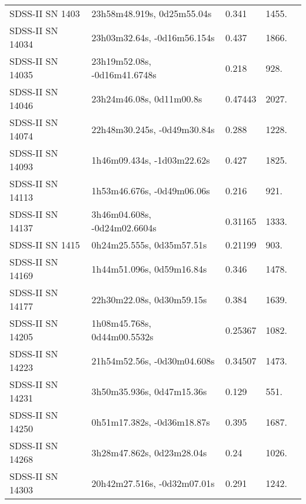 \begin{longtable}{lllll}
  SDSS-II SN 1403 &     23h58m48.919s, 0d25m55.04s &    0.341 &          1455. &    \citet{2010ApJ...713.1026D} \\
 SDSS-II SN 14034 &    23h03m32.64s, -0d16m56.154s &    0.437 &          1866. &    \citet{2011ApJ...738..162S} \\
 SDSS-II SN 14035 &   23h19m52.08s, -0d16m41.6748s &    0.218 &           928. &    \citet{2011ApJ...738..162S} \\
 SDSS-II SN 14046 &       23h24m46.08s, 0d11m00.8s &  0.47443 &          2027. &    \citet{2016SDSSD.C...0000:} \\
 SDSS-II SN 14074 &    22h48m30.245s, -0d49m30.84s &    0.288 &          1228. &    \citet{2011ApJ...738..162S} \\
 SDSS-II SN 14093 &     1h46m09.434s, -1d03m22.62s &    0.427 &          1825. &    \citet{2010ApJ...713.1026D} \\
 SDSS-II SN 14113 &     1h53m46.676s, -0d49m06.06s &    0.216 &           921. &    \citet{2011ApJ...738..162S} \\
 SDSS-II SN 14137 &   3h46m04.608s, -0d24m02.6604s &  0.31165 &          1333. &    \citet{2016SDSSD.C...0000:} \\
  SDSS-II SN 1415 &      0h24m25.555s, 0d35m57.51s &  0.21199 &           903. &    \citet{2003SDSS1.C...0000:} \\
 SDSS-II SN 14169 &      1h44m51.096s, 0d59m16.84s &    0.346 &          1478. &    \citet{2011ApJ...738..162S} \\
 SDSS-II SN 14177 &      22h30m22.08s, 0d30m59.15s &    0.384 &          1639. &    \citet{2011ApJ...738..162S} \\
 SDSS-II SN 14205 &    1h08m45.768s, 0d44m00.5532s &  0.25367 &          1082. &    \citet{2016SDSSD.C...0000:} \\
 SDSS-II SN 14223 &    21h54m52.56s, -0d30m04.608s &  0.34507 &          1473. &    \citet{2016SDSSD.C...0000:} \\
 SDSS-II SN 14231 &      3h50m35.936s, 0d47m15.36s &    0.129 &           551. &    \citet{2011ApJ...738..162S} \\
 SDSS-II SN 14250 &     0h51m17.382s, -0d36m18.87s &    0.395 &          1687. &    \citet{2011ApJ...738..162S} \\
 SDSS-II SN 14268 &      3h28m47.862s, 0d23m28.04s &     0.24 &          1026. &    \citet{2011ApJ...738..162S} \\
 SDSS-II SN 14303 &    20h42m27.516s, -0d32m07.01s &    0.291 &          1242. &    \citet{2011ApJ...738..162S} \\

\end{longtable}
